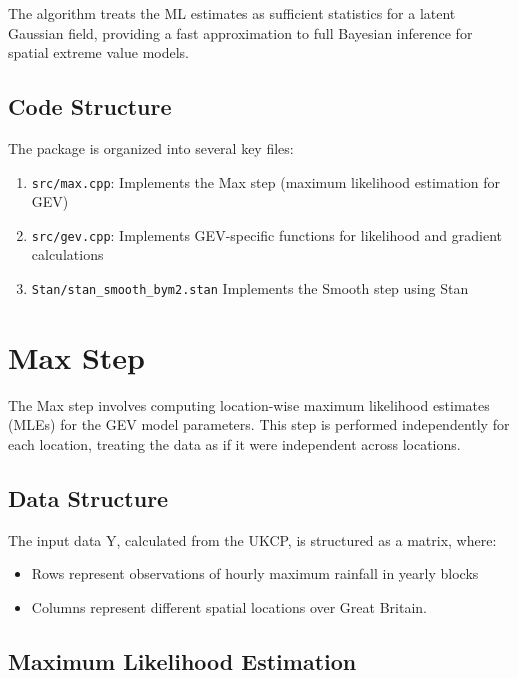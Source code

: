 \documentclass[
  letterpaper,
  DIV=11,
  numbers=noendperiod]{scrartcl}
\providecommand{\tightlist}{%
  \setlength{\itemsep}{0pt}\setlength{\parskip}{0pt}}\usepackage{longtable,booktabs,array}
\begin{document}
The algorithm treats the ML estimates as sufficient statistics for a
latent Gaussian field, providing a fast approximation to full Bayesian
inference for spatial extreme value models.

\subsection{Code Structure}\label{code-structure}

The package is organized into several key files:

\begin{enumerate}
\def\labelenumi{\arabic{enumi}.}
\tightlist
\item
  \texttt{src/max.cpp}: Implements the Max step (maximum likelihood
  estimation for GEV)
\item
  \texttt{src/gev.cpp}: Implements GEV-specific functions for likelihood
  and gradient calculations
\item
  \texttt{Stan/stan\_smooth\_bym2.stan} Implements the Smooth step using
  Stan
\end{enumerate}

\section{Max Step}\label{max-step}

The Max step involves computing location-wise maximum likelihood
estimates (MLEs) for the GEV model parameters. This step is performed
independently for each location, treating the data as if it were
independent across locations.

\subsection{Data Structure}\label{data-structure}

The input data Y, calculated from the UKCP, is structured as a matrix,
where:

\begin{itemize}
\tightlist
\item
  Rows represent observations of hourly maximum rainfall in yearly
  blocks
\item
  Columns represent different spatial locations over Great Britain.
\end{itemize}

\subsection{Maximum Likelihood
Estimation}\label{maximum-likelihood-estimation}
\end{document}

